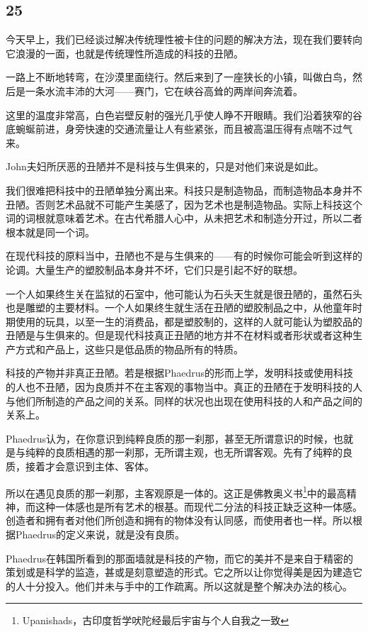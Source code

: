 \documentclass[UTF8]{article}
\begin{document}
\subsection*{25}
\par 今天早上，我们已经谈过解决传统理性被卡住的问题的解决方法，现在我们要转向它浪漫的一面，也就是传统理性所造成的科技的丑陋。
\par 一路上不断地转弯，在沙漠里面绕行。然后来到了一座狭长的小镇，叫做白鸟，然后是一条水流丰沛的大河——赛门，它在峡谷高耸的两岸间奔流着。
\par 这里的温度非常高，白色岩壁反射的强光几乎使人睁不开眼睛。我们沿着狭窄的谷底蜿蜒前进，身旁快速的交通流量让人有些紧张，而且被高温压得有点喘不过气来。
\par John夫妇所厌恶的丑陋并不是科技与生俱来的，只是对他们来说是如此。
\par 我们很难把科技中的丑陋单独分离出来。科技只是制造物品，而制造物品本身并不丑陋。否则艺术品就不可能产生美感了，因为艺术也是制造物品。实际上科技这个词的词根就意味着艺术。在古代希腊人心中，从未把艺术和制造分开过，所以二者根本就是同一个词。
\par 在现代科技的原料当中，丑陋也不是与生俱来的——有的时候你可能会听到这样的论调。大量生产的塑胶制品本身并不坏，它们只是引起不好的联想。
\par 一个人如果终生关在监狱的石室中，他可能认为石头天生就是很丑陋的，虽然石头也是雕塑的主要材料。一个人如果终生就生活在丑陋的塑胶制品之中，从他童年时期使用的玩具，以至一生的消费品，都是塑胶制的，这样的人就可能认为塑胶品的丑陋是与生俱来的。但是现代科技真正丑陋的地方并不在材料或者形状或者这种生产方式和产品上，这些只是低品质的物品所有的特质。
\par 科技的产物并非真正丑陋。若是根据Phaedrus的形而上学，发明科技或使用科技的人也不丑陋，因为良质并不在主客观的事物当中。真正的丑陋在于发明科技的人与他们所制造的产品之间的关系。同样的状况也出现在使用科技的人和产品之间的关系上。
\par Phaedrus认为，在你意识到纯粹良质的那一刹那，甚至无所谓意识的时候，也就是与纯粹的良质相遇的那一刹那，无所谓主观，也无所谓客观。先有了纯粹的良质，接着才会意识到主体、客体。
\par 所以在遇见良质的那一刹那，主客观原是一体的。这正是佛教奥义书\footnote{Upanishads，古印度哲学吠陀经最后宇宙与个人自我之一致}中的最高精神，而这种一体感也是所有艺术的根基。而现代二分法的科技正缺乏这种一体感。创造者和拥有者对他们所创造和拥有的物体没有认同感，而使用者也一样。所以根据Phaedrus的定义来说，就是没有良质。
\par Phaedrus在韩国所看到的那面墙就是科技的产物，而它的美并不是来自于精密的策划或是科学的监造，甚或是刻意塑造的形式。它之所以让你觉得美是因为建造它的人十分投入。他们并未与手中的工作疏离。所以这就是整个解决办法的核心。
\end{document}
